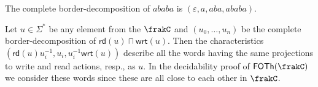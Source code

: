 \documentclass[a4paper,numberwithinsect,USenglish]{lipics-v2018}
\theoremstyle{plain}
\theoremstyle{remark}
\DeclareMathOperator{\lexp}{lexp}
\newcommand{\classfont}[1]{\mathsf{#1}}
\newcommand{\rd}[1]{\mathsf{rd}(#1)}
\newcommand{\wrt}[1]{\mathsf{wrt}(#1)}
\newcommand{\inv}[1]{#1^{-1}}
\newcommand{\cQ}{\frakC}
\newcommand{\FOTh}[1]{\classfont{FOTh}(#1)}
\newcommand{\presuf}{\mathbin{\substack{{\prec}\\{\sqsubsetneq}}}}
\renewcommand{\root}[1]{\sqrt{#1}}
\renewcommand{\epsilon}{\varepsilon}
\renewcommand{\Sigma}{\varSigma}
\begin{document}
\begin{example}
	The complete border-decomposition of $ababa$ is $(\epsilon, a, aba, ababa)$.
\end{example}

Let $u\in\Sigma^*$ be any element from the $\cQ$ and $(u_0,\dots,u_n)$ be the complete border-decomposition of $\rd{u}\sqcap\wrt{u}$. Then the characteristics $(\rd{u}\inv{u_i},u_i,\inv{u_i}\wrt{u})$ describe all the words having the same projections to write and read actions, resp., as $u$. In the decidability proof of $\FOTh{\cQ}$ we consider these words since these are all close to each other in $\cQ$.

%

%
\end{document}
